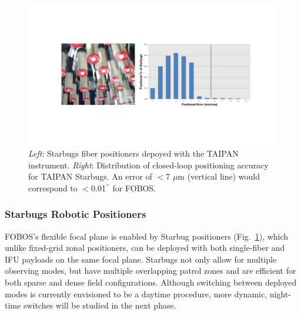 \documentclass[oneside,11pt]{amsart}
\newcommand{\arcsec}{\mbox{$^{\prime\prime}$}}
\newcommand{\note}[2][todo]{{\color{#1}[[{\bf #2}]]}}
\begin{document}



\begin{figure}[h!]
\vskip -0.1in
\includegraphics[width=\textwidth]{figs/starbugs_combined.pdf}
\caption{\small {\it Left}: Starbugs fiber positioners depoyed with the TAIPAN instrument. {\it Right}: Distribution of closed-loop positioning accuracy for TAIPAN Starbugs.  An error of $<$7 $\mu$m (vertical line) would correspond to $<$0.01\arcsec{} for FOBOS.}
\label{fig:starbugs}
\end{figure}


\subsubsection{Starbugs Robotic Positioners}
\label{sec:starbugs}

FOBOS's flexible focal plane is enabled by Starbug positioners (Fig.~\ref{fig:starbugs}), which unlike fixed-grid zonal positioners, can be deployed with both single-fiber and IFU payloads on the same focal plane.  Starbugs not only allow for multiple observing modes, but have multiple overlapping patrol zones and are efficient for both sparse and dense field configurations.  Although switching between deployed modes is currently envisioned to be a daytime procedure, more dynamic, night-time switches will be studied in the next phase.
\end{document}
